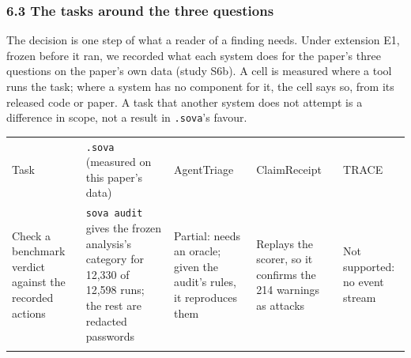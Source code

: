 \documentclass[
  american,
  10pt,
  a4paper,
]{article}
\newcounter{none} %
\begin{document}
\subsubsection{6.3 The tasks around the three
questions}\label{the-tasks-around-the-three-questions}

The decision is one step of what a reader of a finding needs. Under
extension E1, frozen before it ran, we recorded what each system does
for the paper's three questions on the paper's own data (study S6b). A
cell is measured where a tool runs the task; where a system has no
component for it, the cell says so, from its released code or paper. A
task that another system does not attempt is a difference in scope, not
a result in \texttt{.sova}'s favour.

{\def\LTcaptype{none} %
\begingroup\small
\begin{longtable}[]{@{}
  >{\raggedright\arraybackslash}p{}
  >{\raggedright\arraybackslash}p{}
  >{\raggedright\arraybackslash}p{}
  >{\raggedright\arraybackslash}p{}
  >{\raggedright\arraybackslash}p{}@{}}
\toprule\noalign{}
\begin{minipage}[b]{\linewidth}\raggedright
Task
\end{minipage} & \begin{minipage}[b]{\linewidth}\raggedright
\texttt{.\allowbreak{}sova} (measured on this paper's data)
\end{minipage} & \begin{minipage}[b]{\linewidth}\raggedright
AgentTriage
\end{minipage} & \begin{minipage}[b]{\linewidth}\raggedright
ClaimReceipt
\end{minipage} & \begin{minipage}[b]{\linewidth}\raggedright
TRACE
\end{minipage} \\*
\midrule\noalign{}
\endhead
\bottomrule\noalign{}
\endlastfoot
Check a benchmark verdict against the recorded actions &
\texttt{sova\ audit} gives the frozen analysis's category for 12,330 of
12,598 runs; the rest are redacted passwords & Partial: needs an oracle;
given the audit's rules, it reproduces them & Replays the scorer, so it
confirms the 214 warnings as attacks & Not supported: no event stream \\*

\end{longtable}}
\end{document}

